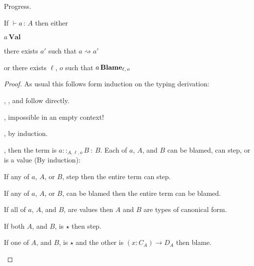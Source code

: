 \begin{thm} Progress.
 
If $\vdash a\,:\,A$ then either
 
$a\,\textbf{Val}$
 
there exists $a'$ such that $a\rightsquigarrow a'$
 
or there exists $\ell$, $o$ such that $a\,\textbf{Blame}{}_{\ell,\,o}$
\end{thm}
\begin{proof}
As usual this follows form induction on the typing derivation:
\begin{casenv}
 \item {}, , and  follow directly.
 \item {}, impossible in an empty context!
 \item {}, by induction.
 \item {}, then the term is $a::_{A,\ell ,o}B\::\:B$.
 Each of $a$, $A$, and $B$ can be blamed, can step, or is a value (By induction):
 \begin{casenv}
   \item If any of $a$, $A$, or $B$, step then the entire term can step.
   \item If any of $a$, $A$, or $B$, can be blamed then the entire term can be blamed.
   \item If all of $a$, $A$, and $B$, are values then $A$ and $B$ are types of canonical form.
   \begin{casenv}
     \item If both $A$, and $B$, is $\star$ then step.
     \item If one of $A$, and $B$, is $\star$ and the other is $\left(x:C_{A}\right)\rightarrow D_{A}$ then blame.
    

\end{casenv}
\end{casenv}
\end{casenv}
\end{proof}
